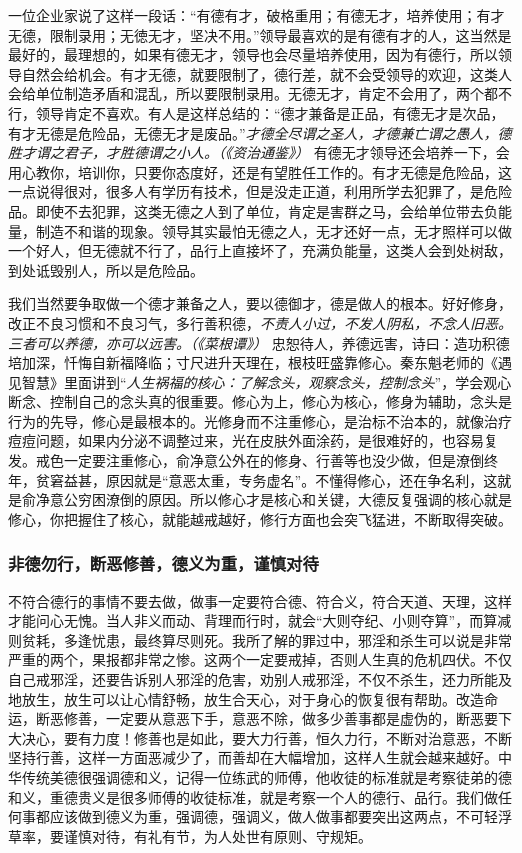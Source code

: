 一位企业家说了这样一段话：“有德有才，破格重用；有德无才，培养使用；有才无德，限制录用；无徳无才，坚决不用。”领导最喜欢的是有德有才的人，这当然是最好的，最理想的，如果有德无才，领导也会尽量培养使用，因为有德行，所以领导自然会给机会。有才无德，就要限制了，德行差，就不会受领导的欢迎，这类人会给单位制造矛盾和混乱，所以要限制录用。无德无才，肯定不会用了，两个都不行，领导肯定不喜欢。有人是这样总结的：“德才兼备是正品，有德无才是次品，有才无德是危险品，无德无才是废品。”\textit{才德全尽谓之圣人，才德兼亡谓之愚人，德胜才谓之君子，才胜德谓之小人。（《资治通鉴》）} 有德无才领导还会培养一下，会用心教你，培训你，只要你态度好，还是有望胜任工作的。有才无德是危险品，这一点说得很对，很多人有学历有技术，但是没走正道，利用所学去犯罪了，是危险品。即使不去犯罪，这类无德之人到了单位，肯定是害群之马，会给单位带去负能量，制造不和谐的现象。领导其实最怕无德之人，无才还好一点，无才照样可以做一个好人，但无德就不行了，品行上直接坏了，充满负能量，这类人会到处树敌，到处诋毁别人，所以是危险品。

我们当然要争取做一个德才兼备之人，要以德御才，德是做人的根本。好好修身，改正不良习惯和不良习气，多行善积德，\textit{不责人小过，不发人阴私，不念人旧恶。三者可以养德，亦可以远害。（《菜根谭》）} 忠恕待人，养德远害，诗曰：造功积德培加深，忏悔自新福降临；寸尺进升天理在，根枝旺盛靠修心。秦东魁老师的《遇见智慧》里面讲到“\textit{人生祸福的核心：了解念头，观察念头，控制念头}”，学会观心断念、控制自己的念头真的很重要。修心为上，修心为核心，修身为辅助，念头是行为的先导，修心是最根本的。光修身而不注重修心，是治标不治本的，就像治疗痘痘问题，如果内分泌不调整过来，光在皮肤外面涂药，是很难好的，也容易复发。戒色一定要注重修心，俞净意公外在的修身、行善等也没少做，但是潦倒终年，贫窘益甚，原因就是“意恶太重，专务虚名”。不懂得修心，还在争名利，这就是俞净意公穷困潦倒的原因。所以修心才是核心和关键，大德反复强调的核心就是修心，你把握住了核心，就能越戒越好，修行方面也会突飞猛进，不断取得突破。

\subsubsection{非德勿行，断恶修善，德义为重，谨慎对待}

不符合德行的事情不要去做，做事一定要符合德、符合义，符合天道、天理，这样才能问心无愧。当人非义而动、背理而行时，就会“大则夺纪、小则夺算”，而算减则贫耗，多逢忧患，最终算尽则死。我所了解的罪过中，邪淫和杀生可以说是非常严重的两个，果报都非常之惨。这两个一定要戒掉，否则人生真的危机四伏。不仅自己戒邪淫，还要告诉别人邪淫的危害，劝别人戒邪淫，不仅不杀生，还力所能及地放生，放生可以让心情舒畅，放生合天心，对于身心的恢复很有帮助。改造命运，断恶修善，一定要从意恶下手，意恶不除，做多少善事都是虚伪的，断恶要下大决心，要有力度！修善也是如此，要大力行善，恒久力行，不断对治意恶，不断坚持行善，这样一方面恶减少了，而善却在大幅增加，这样人生就会越来越好。中华传统美德很强调德和义，记得一位练武的师傅，他收徒的标准就是考察徒弟的德和义，重德贵义是很多师傅的收徒标准，就是考察一个人的德行、品行。我们做任何事都应该做到德义为重，强调德，强调义，做人做事都要突出这两点，不可轻浮草率，要谨慎对待，有礼有节，为人处世有原则、守规矩。

